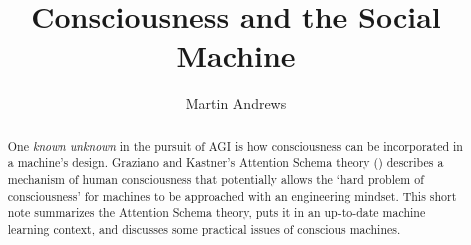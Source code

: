 \documentclass[citeauthoryear]{llncs}
\begin{document}
%
\frontmatter          %
%
\pagestyle{headings}  %
%
\mainmatter              %
%
\title{Consciousness and the Social Machine}
%
%
\author{Martin Andrews}
%
%
%

\maketitle              %

\begin{abstract}

One \emph{known unknown} in the pursuit of AGI is how consciousness can be incorporated
in a machine's design.  
%
Graziano and Kastner's Attention Schema theory (\cite{GrazianoKastner})
describes a mechanism of human consciousness 
that potentially allows the `hard problem of consciousness' for machines 
to be approached with an engineering mindset.
%
This short note summarizes the Attention Schema theory, 
puts it in an up-to-date machine learning context, 
and discusses some practical issues of conscious machines.

\end{abstract}
%

%
%
%
\end{document}
